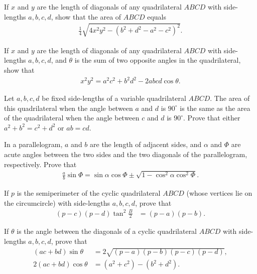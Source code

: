 \documentclass[12pt,a4paper]{memoir}
\theoremstyle{definition}
\begin{document}
\begin{question}
	If $x$ and $y$ are the length of diagonals of any quadrilateral $ABCD$ with side-lengths $a,b,c,d$, show that the area of $ABCD$ equals
	\begin{align*}
		\frac{1}{4}\sqrt{4x^2y^2 - (b^2+d^2-a^2-c^2)^2}.
	\end{align*}
\end{question}


\begin{question}
	If $x$ and $y$ are the length of diagonals of any quadrilateral $ABCD$ with side-lengths $a,b,c,d$, and $\theta$ is the sum of two opposite angles in the quadrilateral, show that
	\begin{align*}
		x^2y^2=a^2c^2+b^2d^2-2abcd\cos \theta.
	\end{align*}
\end{question}

\begin{question}
	Let $a,b,c,d$ be fixed side-lengths of a variable quadrilateral $ABCD$. The area of this quadrilateral when the angle between $a$ and $d$ is $90^\circ$ is the same as the area of the quadrilateral when the angle between $c$ and $d$ is $90^\circ$. Prove that either $a^2+b^2=c^2+d^2$ or $ab=cd$.
\end{question}


\begin{question}
	In a parallelogram, $a$ and $b$ are the length of adjacent sides, and $\alpha$ and $\Phi$ are acute angles between the two sides and the two diagonals of the parallelogram, respectively. Prove that
	\begin{align*}
		\frac{a}{b}\sin \Phi = \sin \alpha \cos \Phi \pm \sqrt{1-\cos^2\alpha \cos^2\Phi}.
	\end{align*}
\end{question}




\begin{question}
	If $p$ is the semiperimeter of the cyclic quadrilateral $ABCD$ (whose vertices lie on the circumcircle) with side-lengths $a,b,c,d$, prove that
	\begin{align*}
		(p-c)(p-d)\tan^2\frac{B}{2} &= (p-a)(p-b).
	\end{align*}
\end{question}

\begin{question}
	If $\theta$ is the angle between the diagonals of a cyclic quadrilateral $ABCD$ with side-lengths $a,b,c,d$, prove that
	\begin{align*}
		(ac+bd)\sin \theta &= 2\sqrt{(p-a)(p-b)(p-c)(p-d)},\\
		2(ac+bd)\cos \theta &= (a^2+c^2)-(b^2+d^2).
	\end{align*}
\end{question}
\end{document}
